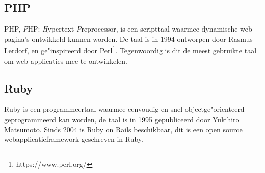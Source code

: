 \documentclass[twoside,openright]{uva-bachelor-thesis}
\begin{document}
			\subsection{PHP}
				PHP, \textit{P}HP: \textit{H}ypertext \textit{P}reprocessor, is een scripttaal waarmee dynamische web pagina's ontwikkeld kunnen worden. De taal is in 1994 ontworpen door Rasmus Lerdorf, en ge"inspireerd door Perl\footnote{https://www.perl.org/}. Tegenwoordig is dit de meest gebruikte taal om web applicaties mee te ontwikkelen. 
			\subsection{Ruby}
				Ruby is een programmeertaal waarmee eenvoudig en snel objectge"orienteerd geprogrammeerd kan worden, de taal is in 1995 gepubliceerd door Yukihiro Matsumoto. Sinds 2004 is Ruby on Rails beschikbaar, dit is een open source webapplicatieframework geschreven in Ruby. 
\end{document}
